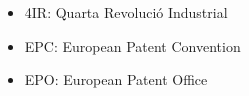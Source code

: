 \documentclass[12pt]{article}
\begin{document}
\vspace{\baselineskip}

\vspace{\baselineskip}

\vspace{\baselineskip}
\begin{itemize}
	\item 4IR: Quarta Revolució Industrial\par


\vspace{\baselineskip}
	\item EPC: European Patent Convention\par


\vspace{\baselineskip}
	\item EPO: European Patent Office
\end{itemize}\par
\end{document}
